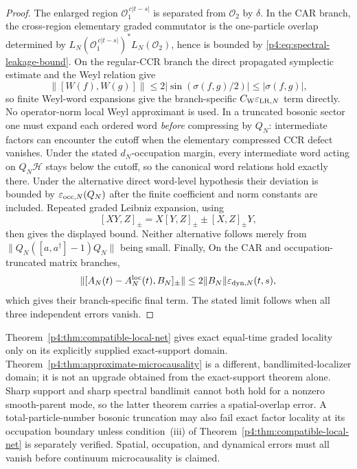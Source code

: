\documentclass[12pt,a4paper]{article}
\begin{document}
\begin{proof}
The enlarged region \(\mathcal O_1^{\,c|t-s|}\) is separated from
\(\mathcal O_2\) by \(\delta\).  In the CAR branch, the cross-region
elementary graded commutator is the one-particle overlap determined by
\(L_N(\mathcal O_1^{\,c|t-s|})^*L_N(\mathcal O_2)\), hence is bounded by
\eqref{p4:eq:spectral-leakage-bound}.  On the regular-CCR branch the direct
propagated symplectic estimate and the Weyl relation give
\[
\|[W(f),W(g)]\|
\le 2|\sin(\sigma(f,g)/2)|
\le |\sigma(f,g)|,
\]
so finite Weyl-word expansions give the branch-specific
\(C_{\rm W}\varepsilon_{{\rm LR},N}\) term directly.  No operator-norm
local Weyl approximant is used.  In a truncated bosonic sector one must expand each ordered word \emph{before}
compressing by \(Q_N\): intermediate factors can encounter the cutoff
when the elementary compressed CCR defect vanishes. Under the stated
\(d_N\)-occupation margin, every intermediate word acting on
\(Q_N\mathcal H\) stays below the cutoff, so the canonical word
relations hold exactly there. Under the alternative direct word-level
hypothesis their deviation is bounded by
\(\varepsilon_{{\rm occ},N}(Q_N)\) after the finite coefficient
and norm constants are included. Repeated graded Leibniz expansion, using
\[
[XY,Z]_{\pm}=X[Y,Z]_{\pm}\pm[X,Z]_{\pm}Y,
\]
then gives the displayed bound. Neither alternative follows merely
from \(\|Q_N([a,a^\dagger]-1)Q_N\|\) being small.  Finally,
On the CAR and occupation-truncated matrix branches,
\[
\|[A_N(t)-A_N^{\rm loc}(t),B_N]_\pm\|
\le2\|B_N\|\varepsilon_{{\rm dyn},N}(t,s),
\]
which gives their branch-specific final term.  The stated limit follows when all three
independent errors vanish.
\end{proof}

\begin{remark}
\label{p4:rem:microcausality-status}
Theorem~\ref{p4:thm:compatible-local-net} gives exact equal-time graded
locality only on its explicitly supplied exact-support domain.
Theorem~\ref{p4:thm:approximate-microcausality} is a different,
bandlimited-localizer domain; it is not an upgrade obtained from the
exact-support theorem alone.  Sharp support and sharp spectral bandlimit
cannot both hold for a nonzero smooth-parent mode, so the latter theorem
carries a spatial-overlap error.  A total-particle-number bosonic truncation
may also fail exact factor locality at its occupation boundary unless
condition~(iii) of Theorem~\ref{p4:thm:compatible-local-net} is separately
verified.  Spatial, occupation, and dynamical errors must all vanish before
continuum microcausality is claimed.
\end{remark}
\end{document}
